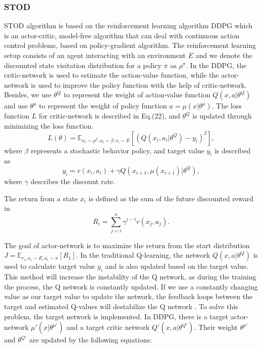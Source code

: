 \documentclass[journal]{IEEEtran}
\begin{document}
\subsubsection{STOD} 
STOD algorithm is based on the reinforcement learning algorithm DDPG which is an actor-critic, model-free algorithm that can deal with continuous action control problems, based on policy-gradient algorithm\cite{kaelbling1996reinforcement}. The reinforcement learning setup consists of an agent interacting with an environment \(E\) and we denote the discounted state visitation distribution for a policy \(\pi\) as \(\rho ^{\pi} \). In the DDPG, the critic-network is used to estimate the action-value function, while the actor-network is used to improve the policy function with the help of critic-network. Besides, we use \(\theta^{Q}\) to represent the weight of action-value function \(Q(x,a|\theta^{Q})\) and use \(\theta^{\mu}\) to represent the weight of policy function \(a=\mu (x|\theta^{\mu})\). The loss function \(L\) for critic-network is described in Eq.(22), and \(\theta^Q\) is updated through minimizing the loss function.
\begin{equation}
L(\theta) = \mathbb{E}_{x_i \sim \rho ^\beta, a_i \sim \beta, r_i \sim E}[(Q(x_i,a_i|\theta^Q)-y_i)^2],
\end{equation}
where \(\beta\) represents a stochastic behavior policy, and target value \(y_i\) is described as
\begin{equation}
y_i=r(x_i,a_i)+\gamma Q(x_{i+1},\mu(x_{i+1})|\theta ^ Q),
\end{equation}
where \(\gamma\) describes the discount rate. 
\par  The return from a state \(x_i\) is defined as the sum of the future discounted reward in
\begin{equation}
R_i =  \sum_{j=i}^n \gamma^{j-i} r(x_j,a_j).
\end{equation}
\par The goal of actor-network is to maximize the return from the start distribution \(J=\mathbb{E}_{r_i,x_i\sim E,a_i\sim\pi}[R_1]\). In the traditional Q-learning, the network $Q(x,a|\theta^Q)$ is used to calculate target value $y_i$ and is also updated based on the target value. This method will increase the instability of the Q network, as during the training the process, the Q network is constantly updated. If we use a constantly changing value as our target value to update the network, the feedback loops between the target and estimated Q-values will destabilize the Q network \cite{mnih2013playing} \cite{mnih2015human}. To solve this problem, the target network is implemented. In DDPG, there is a target actor-network \(\mu'(x|\theta^{\mu'})\) and a target critic network \(Q'(x,a|\theta^{Q'})\). Their weight \(\theta^{\mu'}\) and \(\theta^{Q'}\) are updated by the following equations:
\end{document}
